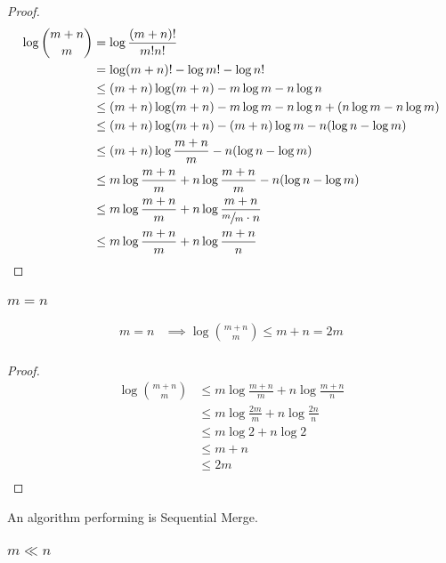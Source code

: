 \begin{proof}
\begin{align*}
\log\binom{m+n}{m} &= \log\frac{(m+n)!}{m!n!}\\
&= \log(m+n)! - \log m! - \log n!\\
&\leq (m+n) \log(m+n) - m \log m - n \log n\\
&\leq (m+n) \log(m+n) - m \log m - n \log n + (n \log m - n \log m)\\
&\leq (m+n) \log(m+n) - (m+n) \log m - n (\log n - \log m)\\
&\leq (m+n) \log\frac{m+n}{m} - n (\log n - \log m)\\
&\leq m \log\frac{m+n}{m} + n \log\frac{m+n}{m} - n (\log n - \log m)\\
&\leq m \log\frac{m+n}{m} + n \log\frac{m+n}{\sfrac{m}{m} \cdot n}\\
&\leq m \log\frac{m+n}{m} + n \log\frac{m+n}{n}\\
\end{align*}
\end{proof}

\subsubsection{$m = n$}

\begin{lemma}
\begin{align*}
m = n &\implies \log\binom{m+n}{m} \leq m + n = 2m\\
\end{align*}
\end{lemma}

\begin{proof}
\begin{align*}
\log\binom{m+n}{m} &\leq m \log\frac{m+n}{m} + n \log\frac{m+n}{n}\\
&\leq m \log\frac{2m}{m} + n \log\frac{2n}{n}\\
&\leq m \log 2 + n \log 2\\
&\leq m + n\\
&\leq 2m\\
\end{align*}
\end{proof}

An algorithm performing  is Sequential Merge.

\subsubsection{$m \ll n$}

